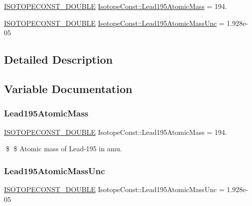 \begin{DoxyCompactItemize}
\item 
\mbox{\hyperlink{group___isotope_const-_macros_ga8f45a7272ce02c0b4c65c44636ed719a}{I\+S\+O\+T\+O\+P\+E\+C\+O\+N\+S\+T\+\_\+\+D\+O\+U\+B\+LE}} \mbox{\hyperlink{group___isotope_const-_lead-_pb195_ga99b7f7b694f62436a529e0b4b00bb147}{Isotope\+Const\+::\+Lead195\+Atomic\+Mass}} = 194.
\item 
\mbox{\hyperlink{group___isotope_const-_macros_ga8f45a7272ce02c0b4c65c44636ed719a}{I\+S\+O\+T\+O\+P\+E\+C\+O\+N\+S\+T\+\_\+\+D\+O\+U\+B\+LE}} \mbox{\hyperlink{group___isotope_const-_lead-_pb195_ga493ecabfe1a2939958811c3ecb2175ec}{Isotope\+Const\+::\+Lead195\+Atomic\+Mass\+Unc}} = 1.\+928e-\/05
\end{DoxyCompactItemize}


\subsection{Detailed Description}


\subsection{Variable Documentation}
\mbox{\label{group___isotope_const-_lead-_pb195_ga99b7f7b694f62436a529e0b4b00bb147}} 
\subsubsection{\texorpdfstring{Lead195\+Atomic\+Mass}{Lead195AtomicMass}}
{\footnotesize\ttfamily \mbox{\hyperlink{group___isotope_const-_macros_ga8f45a7272ce02c0b4c65c44636ed719a}{I\+S\+O\+T\+O\+P\+E\+C\+O\+N\+S\+T\+\_\+\+D\+O\+U\+B\+LE}} Isotope\+Const\+::\+Lead195\+Atomic\+Mass = 194.}

\$ \$ Atomic mass of Lead-\/195 in amu. \mbox{\label{group___isotope_const-_lead-_pb195_ga493ecabfe1a2939958811c3ecb2175ec}} 
\subsubsection{\texorpdfstring{Lead195\+Atomic\+Mass\+Unc}{Lead195AtomicMassUnc}}
{\footnotesize\ttfamily \mbox{\hyperlink{group___isotope_const-_macros_ga8f45a7272ce02c0b4c65c44636ed719a}{I\+S\+O\+T\+O\+P\+E\+C\+O\+N\+S\+T\+\_\+\+D\+O\+U\+B\+LE}} Isotope\+Const\+::\+Lead195\+Atomic\+Mass\+Unc = 1.\+928e-\/05}

